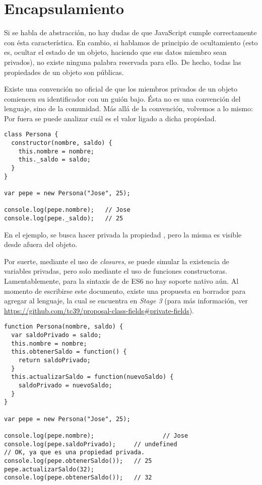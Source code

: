 \section{Encapsulamiento}

Si se habla de abstracción, no hay dudas de que JavaScript cumple correctamente con ésta característica. En cambio, si hablamos de principio de ocultamiento (esto es, ocultar el estado de un objeto, haciendo que sus datos miembro sean privados), no existe ninguna palabra reservada para ello. De hecho, todas las propiedades de un objeto son públicas.

Existe una convención no oficial de que los miembros privados de un objeto comiencen su identificador con un guión bajo. Ésta no es una convención del lenguaje, sino de la comunidad. Más allá de la convención, volvemos a lo mismo: Por fuera se puede analizar cuál es el valor ligado a dicha propiedad.

\begin{lstlisting}[title={Descubriendo variables "`privadas"'}]
class Persona {
  constructor(nombre, saldo) {
    this.nombre = nombre;
    this._saldo = saldo;
  }
}

var pepe = new Persona("Jose", 25);

console.log(pepe.nombre);	// Jose
console.log(pepe._saldo);	// 25
\end{lstlisting}

En el ejemplo, se busca hacer privada la propiedad , pero la misma es visible desde afuera del objeto.

Por suerte, mediante el uso de \textit{closures}, se puede simular la existencia de variables privadas, pero solo mediante el uso de funciones constructoras. Lamentablemente, para la sintaxis de  de ES6 no hay soporte nativo aún. Al momento de escribirse este documento, existe una propuesta en borrador para agregar al lenguaje, la cual se encuentra en \textit{Stage 3} (para más información, ver \href{https://github.com/tc39/proposal-class-fields#private-fields}{https://github.com/tc39/proposal-class-fields\#private-fields}).

\begin{lstlisting}[title={Alcanzando variables privadas mediante closures}]
function Persona(nombre, saldo) {
  var saldoPrivado = saldo;
  this.nombre = nombre;
  this.obtenerSaldo = function() {
    return saldoPrivado;
  }
  this.actualizarSaldo = function(nuevoSaldo) {
    saldoPrivado = nuevoSaldo;
  }
}

var pepe = new Persona("Jose", 25);

console.log(pepe.nombre);					// Jose
console.log(pepe.saldoPrivado);		// undefined
// OK, ya que es una propiedad privada.
console.log(pepe.obtenerSaldo());	// 25
pepe.actualizarSaldo(32);
console.log(pepe.obtenerSaldo());	// 32
\end{lstlisting}

